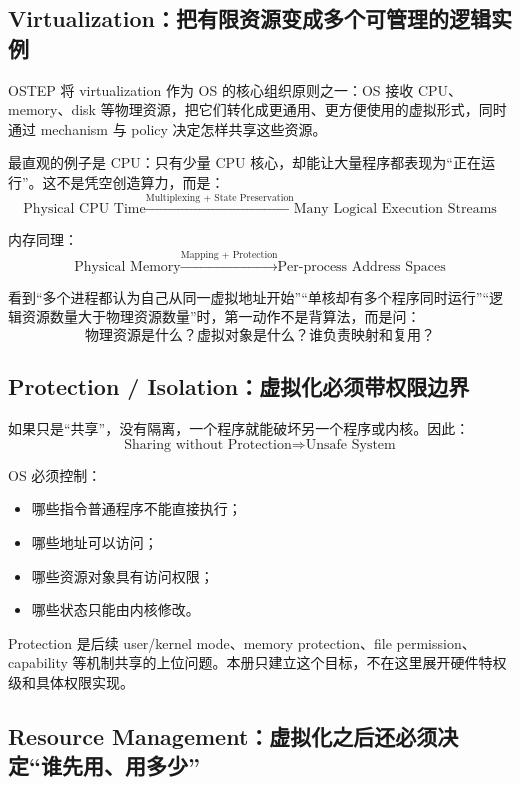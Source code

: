 \documentclass[11pt,a4paper]{ctexart}
\begin{document}
\subsection{Virtualization：把有限资源变成多个可管理的逻辑实例}

OSTEP 将 virtualization 作为 OS 的核心组织原则之一：OS 接收 CPU、memory、disk 等物理资源，把它们转化成更通用、更方便使用的虚拟形式，同时通过 mechanism 与 policy 决定怎样共享这些资源。

最直观的例子是 CPU：只有少量 CPU 核心，却能让大量程序都表现为“正在运行”。这不是凭空创造算力，而是：
\[
\boxed{
\text{Physical CPU Time}
\xrightarrow{\text{Multiplexing + State Preservation}}
\text{Many Logical Execution Streams}
}
\]

内存同理：
\[
\boxed{
\text{Physical Memory}
\xrightarrow{\text{Mapping + Protection}}
\text{Per-process Address Spaces}
}
\]

\begin{exam}[题目信号]
看到“多个进程都认为自己从同一虚拟地址开始”“单核却有多个程序同时运行”“逻辑资源数量大于物理资源数量”时，第一动作不是背算法，而是问：
\[
\boxed{\text{物理资源是什么？虚拟对象是什么？谁负责映射和复用？}}
\]
\end{exam}

\subsection{Protection / Isolation：虚拟化必须带权限边界}

如果只是“共享”，没有隔离，一个程序就能破坏另一个程序或内核。因此：
\[
\boxed{\text{Sharing without Protection}\Rightarrow\text{Unsafe System}}
\]

OS 必须控制：
\begin{itemize}
  \item 哪些指令普通程序不能直接执行；
  \item 哪些地址可以访问；
  \item 哪些资源对象具有访问权限；
  \item 哪些状态只能由内核修改。
\end{itemize}

Protection 是后续 user/kernel mode、memory protection、file permission、capability 等机制共享的上位问题。本册只建立这个目标，不在这里展开硬件特权级和具体权限实现。

\subsection{Resource Management：虚拟化之后还必须决定“谁先用、用多少”}
\end{document}
